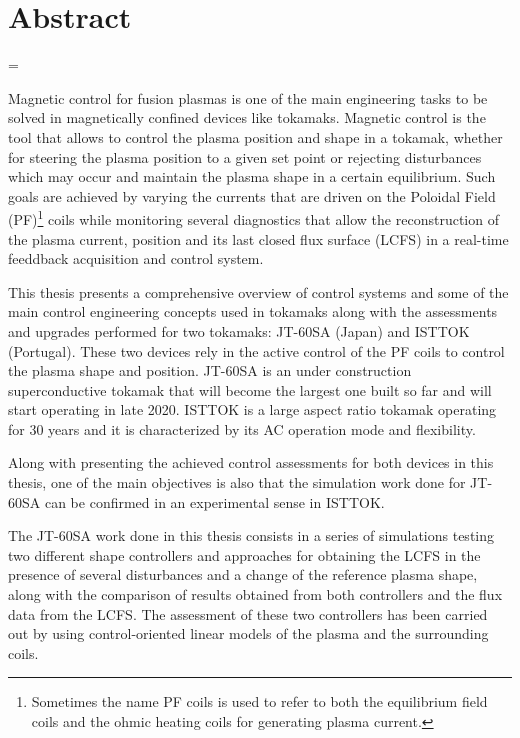 \chapter*{Abstract}
\emergencystretch=\maxdimen
{}

Magnetic control for fusion plasmas is one of the main engineering tasks to be solved in magnetically  confined devices like tokamaks. Magnetic control is the tool that allows to control the plasma position and shape in a tokamak, whether  for steering the plasma position to a given set point or rejecting disturbances which may occur and maintain the plasma shape in a certain equilibrium. Such goals are achieved by varying the currents that are driven on the Poloidal Field (PF)\footnote{Sometimes the name PF coils is used to refer to  both the equilibrium field coils and the ohmic heating coils for generating plasma current.} coils while monitoring several diagnostics that allow the reconstruction of the plasma current, position and its last closed flux surface (LCFS) in a real-time feeddback acquisition and control system.
\smallskip

This thesis presents a comprehensive overview of control systems and some of the main control engineering concepts used in tokamaks along with  the assessments and upgrades performed for two tokamaks: JT-60SA (Japan) and ISTTOK (Portugal). These two devices rely in the active control of the PF coils to control the plasma shape and position. JT-60SA is an under construction superconductive tokamak that will become the largest one built so far and will start operating in late 2020. ISTTOK is a large aspect ratio tokamak operating for 30 years and it is characterized by its AC operation mode and flexibility. \smallskip

 Along with presenting the achieved control assessments for both devices in this thesis, one of the main objectives  is also that the simulation work done for JT-60SA can be confirmed in an experimental sense in ISTTOK. \smallskip

 
The JT-60SA work done in this thesis consists in a series of simulations testing two different shape controllers and  approaches for obtaining the LCFS  in the presence of several disturbances and a change of the reference plasma shape, along with the comparison of results obtained from both controllers and the flux data from the LCFS.   The assessment of these two controllers has been carried out by using control-oriented linear models of the plasma and the surrounding coils.\smallskip

